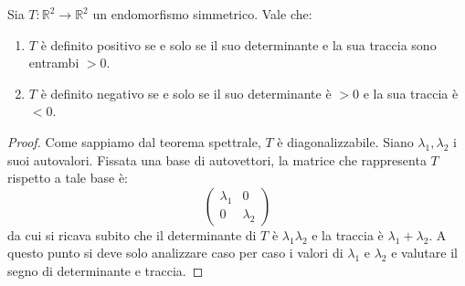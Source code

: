\begin{proposition}
	Sia $T : \mathbb{R}^2 \to \mathbb{R}^2$ un endomorfismo simmetrico. Vale che:
	\begin{enumerate}
		\item
		      $T$ \`e definito positivo se e solo se il suo determinante e la sua
		      traccia sono entrambi $> 0$.
		\item
		      $T$ \`e definito negativo se e solo se il suo determinante \`e $> 0$ e
		      la sua traccia \`e $< 0$.
	\end{enumerate}

	\begin{proof}
		Come sappiamo dal teorema spettrale, $T$ \`e diagonalizzabile. Siano
		$\lambda_1, \lambda_2$ i suoi autovalori. Fissata una base di autovettori,
		la matrice che rappresenta $T$ rispetto a tale base \`e:
		\begin{equation*}
			\begin{pmatrix}
				\lambda_1 & 0         \\
				0         & \lambda_2
			\end{pmatrix}
		\end{equation*}
		da cui si ricava subito che il determinante di $T$ \`e $\lambda_1 \lambda_2$
		e la traccia \`e $\lambda_1 + \lambda_2$. A questo punto si deve solo
		analizzare caso per caso i valori di $\lambda_1$ e $\lambda_2$ e valutare
		il segno di determinante e traccia.
	\end{proof}
\end{proposition}

